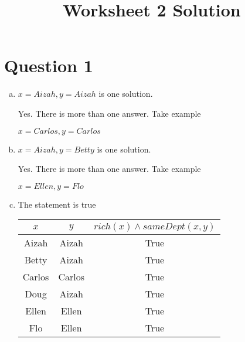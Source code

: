 \documentclass[12pt]{article}
\begin{document}
\title{Worksheet 2 Solution}
\maketitle

\section*{Question 1}

\begin{enumerate}[a)]
    \item
        $x = Aizah, y = Aizah$ is one solution.

        \bigskip

        Yes. There is more than one answer. Take example

        $x = Carlos, y = Carlos$

    \bigskip

    \item
        $x = Aizah, y = Betty$ is one solution.

        \bigskip

        Yes. There is more than one answer. Take example

        $x = Ellen, y = Flo$

    \item
        The statement is true

        \begin{tabular}{ c | c | c }
            $x$ & $y$ & $rich(x) \land sameDept(x,y)$ \\
            \hline
            Aizah & Aizah & True \\
            \hline
            Betty & Aizah & True \\
            \hline
            Carlos & Carlos & True \\
            \hline
            Doug & Aizah & True \\
            \hline
            Ellen & Ellen & True \\
            \hline
            Flo & Ellen & True \\
            \hline
        \end{tabular}
\end{enumerate}
\end{document}

